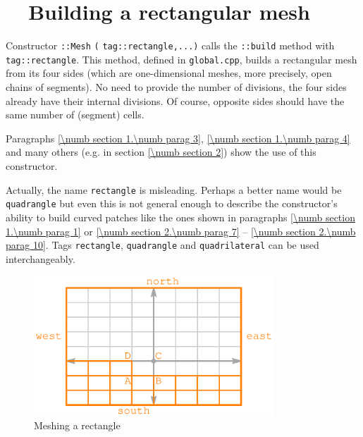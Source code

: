 \section{~~Building a rectangular mesh}\label{\numb section 12.\numb parag 3}

Constructor {\small\tt {}::Mesh} {\small\tt(} {\small\tt\textcolor{tag}{tag}::rectangle,...)}
calls the {\small\tt{}::build} method with {\small\tt \textcolor{tag}{tag}::rectangle}.
This method, defined in {\small\tt global.cpp}, builds a rectangular mesh from its
four sides (which are one-dimensional meshes, more precisely, open chains of segments).
No need to provide the number of divisions, the four sides already have their internal divisions.
Of course, opposite sides should have the same number of (segment) cells.

Paragraphs \ref{\numb section 1.\numb parag 3}, \ref{\numb section 1.\numb parag 4} and
many others (e.g. in section \ref{\numb section 2}) show the use of this constructor.

Actually, the name {\small\tt rectangle} is misleading.
Perhaps a better name would be {\small\tt quadrangle} but even this is not general enough to
describe the constructor's ability to build curved patches like the ones shown in paragraphs
\ref{\numb section 1.\numb parag 1} or \ref{\numb section 2.\numb parag 7} --
\ref{\numb section 2.\numb parag 10}.
Tags {\small\tt rectangle}, {\small\tt quadrangle} and {\small\tt quadrilateral} can be used
interchangeably.

\begin{figure}[ht] \centering
  \includegraphics[width=90mm]{fig-rectangle}
  \caption{Meshing a rectangle}
  \label{\numb section 12.\numb fig 1}
\end{figure}

